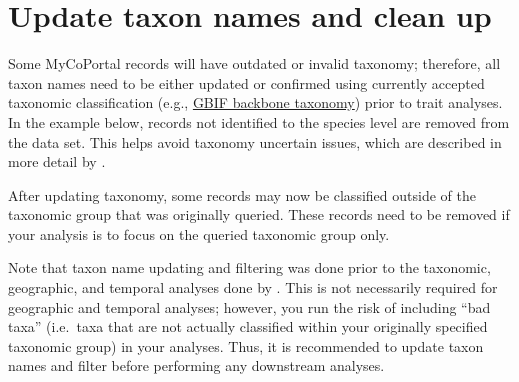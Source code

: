 \documentclass[
]{book}
\newenvironment{Shaded}{\begin{snugshade}}{\end{snugshade}}
\newcommand{\AttributeTok}[1]{\textcolor[rgb]{0.77,0.63,0.00}{#1}}
\newcommand{\CommentTok}[1]{\textcolor[rgb]{0.56,0.35,0.01}{\textit{#1}}}
\newcommand{\ConstantTok}[1]{\textcolor[rgb]{0.00,0.00,0.00}{#1}}
\newcommand{\FunctionTok}[1]{\textcolor[rgb]{0.00,0.00,0.00}{#1}}
\newcommand{\NormalTok}[1]{#1}
\newcommand{\OtherTok}[1]{\textcolor[rgb]{0.56,0.35,0.01}{#1}}
\newcommand{\SpecialCharTok}[1]{\textcolor[rgb]{0.00,0.00,0.00}{#1}}
\newcommand{\StringTok}[1]{\textcolor[rgb]{0.31,0.60,0.02}{#1}}
\begin{document}
\hypertarget{update-taxon-names-and-clean-up}{%
\section{Update taxon names and clean up}\label{update-taxon-names-and-clean-up}}

Some MyCoPortal records will have outdated or invalid taxonomy; therefore, all taxon names need to be either updated or confirmed using currently accepted taxonomic classification (e.g., \href{https://www.gbif.org/dataset/d7dddbf4-2cf0-4f39-9b2a-bb099caae36c}{GBIF backbone taxonomy}) prior to trait analyses. In the example below, records not identified to the species level are removed from the data set. This helps avoid taxonomy uncertain issues, which are described in more detail by \citet{fungarium2021}.

After updating taxonomy, some records may now be classified outside of the taxonomic group that was originally queried. These records need to be removed if your analysis is to focus on the queried taxonomic group only.

\begin{Shaded}
\end{Shaded}

Note that taxon name updating and filtering was done prior to the taxonomic, geographic, and temporal analyses done by \citet{fungarium2021}. This is not necessarily required for geographic and temporal analyses; however, you run the risk of including ``bad taxa'' (i.e.~taxa that are not actually classified within your originally specified taxonomic group) in your analyses. Thus, it is recommended to update taxon names and filter before performing any downstream analyses.
\end{document}
